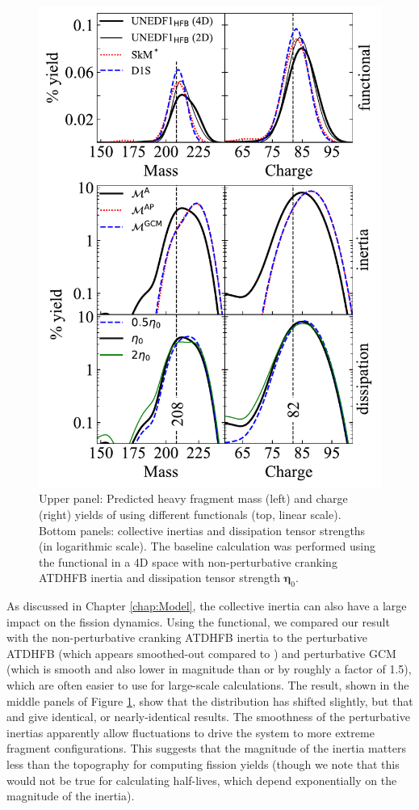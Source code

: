 \begin{figure}
	\centering
	\includegraphics[width=0.7\linewidth]{TeX_files/294Og_compare_all}
	\caption[$^{294}$Og heavy fragment masses and charges.]{Upper panel: Predicted heavy fragment mass (left) and charge (right) yields of \Og{} using different functionals (top, linear scale). Bottom panels: collective inertias and dissipation tensor strengths (in logarithmic scale). The baseline calculation was performed using the \hfb{} functional in a 4D space with non-perturbative cranking ATDHFB inertia and dissipation tensor strength $\mathbf{\eta}_0$.}
	\label{fig:294ogcompareall}
\end{figure}

As discussed in Chapter \ref{chap:Model}, the collective inertia can also have a large impact on the fission dynamics. Using the {\hfb} functional, we compared our result with the non-perturbative cranking ATDHFB inertia {\MATDHF} to the perturbative ATDHFB {\MATDHFp} (which appears smoothed-out compared to {\MATDHF}) and perturbative GCM {\MGCMp} (which is smooth and also lower in magnitude than {\MATDHF} or {\MATDHFp} by roughly a factor of 1.5), which are often easier to use for large-scale calculations. The result, shown in the middle panels of Figure \ref{fig:294ogcompareall}, show that the distribution has shifted slightly, but that {\MATDHFp} and {\MGCMp} give identical, or nearly-identical results. The smoothness of the perturbative inertias apparently allow fluctuations to drive the system to more extreme fragment configurations. This suggests that the magnitude of the inertia matters less than the topography for computing fission yields (though we note that this would not be true for calculating half-lives, which depend exponentially on the magnitude of the inertia).

